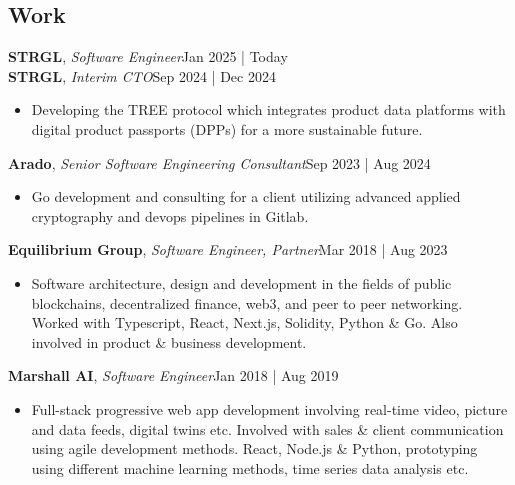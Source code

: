 \documentclass[line,margin]{res}
\begin{document}
\address{jani.anttonen@protonmail.ch | Turku, Finland | https://janianttonen.com}

\begin{resume}
	\vspace{-5mm}

	\section{Work}
	\textbf{STRGL}, {\sl Software Engineer}\hfill Jan 2025 | Today\\
	\textbf{STRGL}, {\sl Interim CTO}\hfill Sep 2024 | Dec 2024\\
	\begin{itemize} \itemsep 3pt
	\item Developing the TREE protocol which integrates product data platforms with digital product passports (DPPs) for a more sustainable future.
	\end{itemize}
 
	\textbf{Arado}, {\sl Senior Software Engineering Consultant}\hfill Sep 2023 | Aug 2024\\
	\begin{itemize} \itemsep 3pt
	\item Go development and consulting for a client utilizing advanced applied cryptography and devops pipelines in Gitlab.
	\end{itemize}
 
	\textbf{Equilibrium Group}, {\sl Software Engineer, Partner}\hfill Mar 2018 | Aug 2023\\
	\begin{itemize} \itemsep 3pt
	\item Software architecture, design and development in the fields of public blockchains, decentralized finance, web3, and peer to peer networking. Worked with Typescript, React, Next.js, Solidity, Python \& Go. Also involved in product \& business development.
	\end{itemize}

	\textbf{Marshall AI}, {\sl Software Engineer}\hfill Jan 2018 | Aug 2019\\
	\begin{itemize} \itemsep 3pt
	\item Full-stack progressive web app development involving real-time video, picture and data feeds, digital twins etc. Involved with sales \& client communication using agile development methods. React, Node.js \& Python, prototyping using different machine learning methods, time series data analysis etc.
	\end{itemize}


\end{resume}
\end{document}
